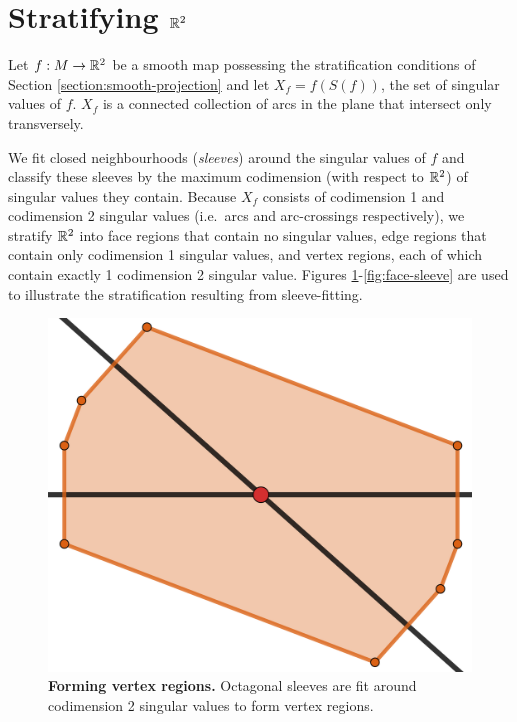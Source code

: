\section{Stratifying $\mathbb{R}^2$}
\label{section:smooth-decompose}

Let $f:M\to\mathbb{R}^2$ be a smooth map possessing the stratification conditions of Section \ref{section:smooth-projection} and let $X_f = f(S(f))$, the set of singular values of $f$.
$X_f$ is a connected collection of arcs in the plane that intersect only transversely.

We fit closed neighbourhoods (\emph{sleeves}) around the singular values of $f$ and classify these sleeves by the maximum codimension (with respect to $\mathbb{R}^2$) of singular values they contain.
Because $X_f$ consists of codimension 1 and codimension 2 singular values (i.e.\ arcs and arc-crossings respectively), we stratify $\mathbb{R}^2$ into face regions that contain no singular values, edge regions that contain only codimension 1 singular values, and vertex regions, each of which contain exactly 1 codimension 2 singular value.
Figures \ref{fig:vertex-sleeve}-\ref{fig:face-sleeve} are used to illustrate the stratification resulting from sleeve-fitting.

\begin{figure}[h!]
	\centering
	\includegraphics[width=\textwidth]{figures/vertex-sleeve.png}
	\caption{
		\textbf{Forming vertex regions.}
		Octagonal sleeves are fit around codimension 2 singular values to form vertex regions.
	}
	\label{fig:vertex-sleeve}
\end{figure}

